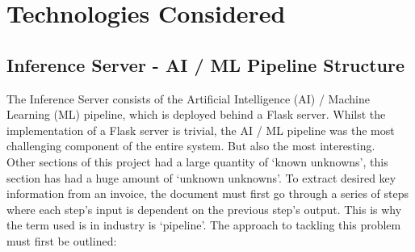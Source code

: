 \section{Technologies Considered}
\label{sec:technologies}
\subsection{Inference Server - AI / ML Pipeline Structure}
The Inference Server consists of the Artificial Intelligence  (AI) / Machine Learning (ML) pipeline, which is deployed behind a Flask server.
Whilst the implementation of a Flask server is trivial, the AI / ML pipeline was the most challenging component of the entire system. But also
the most interesting.\\
Other sections of this project had a large quantity of `known unknowns', this section has had a huge amount of `unknown unknowns'.
To extract desired key information from an invoice, the document must first go
through a series of steps where each step's input is dependent on the previous step's output. This is why the term used is in industry is
`pipeline'. The approach to tackling this problem must first be outlined:

